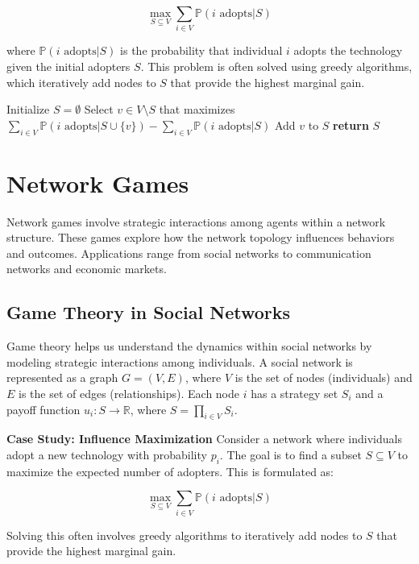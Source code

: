 \documentclass[12pt]{book} %
\begin{document}
\[
\max_{S \subseteq V} \sum_{i \in V} \mathbb{P}(i \text{ adopts} | S)
\]

where $\mathbb{P}(i \text{ adopts} | S)$ is the probability that individual $i$ adopts the technology given the initial adopters $S$. This problem is often solved using greedy algorithms, which iteratively add nodes to $S$ that provide the highest marginal gain.
\FloatBarrier
\begin{algorithm}
\caption{Greedy Algorithm for Influence Maximization}
\begin{algorithmic}[1]
\State Initialize $S = \emptyset$
    \State Select $v \in V \setminus S$ that maximizes $\sum_{i \in V} \mathbb{P}(i \text{ adopts} | S \cup \{v\}) - \sum_{i \in V} \mathbb{P}(i \text{ adopts} | S)$
    \State Add $v$ to $S$
\EndFor
\State \textbf{return} $S$
\end{algorithmic}
\end{algorithm}
\FloatBarrier

\section{Network Games}
Network games involve strategic interactions among agents within a network structure. These games explore how the network topology influences behaviors and outcomes. Applications range from social networks to communication networks and economic markets.

\subsection{Game Theory in Social Networks}
Game theory helps us understand the dynamics within social networks by modeling strategic interactions among individuals. A social network is represented as a graph $G = (V, E)$, where $V$ is the set of nodes (individuals) and $E$ is the set of edges (relationships). Each node $i$ has a strategy set $S_i$ and a payoff function $u_i: S \to \mathbb{R}$, where $S = \prod_{i \in V} S_i$.

\textbf{Case Study: Influence Maximization}
Consider a network where individuals adopt a new technology with probability $p_i$. The goal is to find a subset $S \subseteq V$ to maximize the expected number of adopters. This is formulated as:

\[
\max_{S \subseteq V} \sum_{i \in V} \mathbb{P}(i \text{ adopts} | S)
\]

Solving this often involves greedy algorithms to iteratively add nodes to $S$ that provide the highest marginal gain.
\end{document}
